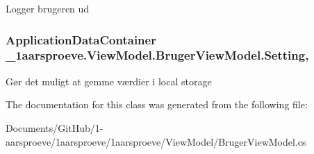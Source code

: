 Logger brugeren ud 

\hypertarget{class__1aarsproeve_1_1_view_model_1_1_bruger_view_model_ac9e91065596a741027a1b88853bd76e6}{}
\subsubsection[{Setting}]{\setlength{\rightskip}{0pt plus 5cm}Application\+Data\+Container \+\_\+1aarsproeve.\+View\+Model.\+Bruger\+View\+Model.\+Setting\hspace{0.3cm}{\ttfamily [get]}, {\ttfamily [set]}}\label{class__1aarsproeve_1_1_view_model_1_1_bruger_view_model_ac9e91065596a741027a1b88853bd76e6}


Gør det muligt at gemme værdier i local storage 



The documentation for this class was generated from the following file\+:\begin{DoxyCompactItemize}
\item 
Documents/\+Git\+Hub/1-\/aarsproeve/1aarsproeve/1aarsproeve/\+View\+Model/Bruger\+View\+Model.\+cs\end{DoxyCompactItemize}

